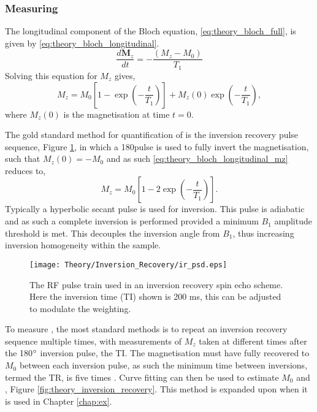 \subsubsection{Measuring \tone}
The longitudinal component of the Bloch equation, \eqref{eq:theory_bloch_full}, is given by \eqref{eq:theory_bloch_longitudinal}.
\begin{equation}
\frac{d\mathbf{M}_z}{dt} = - \frac{\left( M_z - M_0 \right)}{T_1}
\label{eq:theory_bloch_longitudinal}
\end{equation}
Solving this equation for $M_z$ gives,
\begin{equation}
M_z = M_0 \left[1 - \exp\left(-\frac{t}{T_1}\right) \right] + M_z\left( 0 \right) \exp \left(-\frac{t}{T_1}\right), 
\label{eq:theory_bloch_longitudinal_mz}
\end{equation}
where $M_z\left( 0 \right)$ is the magnetisation at time $t=0$.

The gold standard method for quantification of \tone is the inversion recovery pulse sequence, Figure \ref{fig:theory_inversion_recovery_psd}, in which a 180\degree{ }pulse is used to fully invert the magnetisation, such that $M_z(0) = -M_0$ and as such \eqref{eq:theory_bloch_longitudinal_mz} reduces to,
\begin{equation}
M_z = M_0 \left[1 - 2\exp\left(-\frac{t}{T_1}\right) \right].
\label{eq:theory_bloch_longitudinal_mz_inversion}
\end{equation}
Typically a hyperbolic secant pulse is used for inversion. This pulse is adiabatic and as such a complete inversion is performed provided a minimum $B_1$ amplitude threshold is met. This decouples the inversion angle from $B_1$, thus increasing inversion homogeneity within the sample.

\begin{figure}[H]
	\centering
	\texttt{[image: Theory/Inversion\_Recovery/ir\_psd.eps]}
	\caption{The \ac{RF} pulse train used in an inversion recovery spin echo scheme. Here the inversion time (\acs*{TI}) shown is 200 ms, this can be adjusted to modulate the \tone weighting.}
	\label{fig:theory_inversion_recovery_psd}	
\end{figure}

To measure \tone, the most standard methods is to repeat an inversion recovery sequence multiple times, with measurements of $M_z$ taken at different times after the 180$\degree$ inversion pulse, the \ac{TI}. The magnetisation must have fully recovered to $M_0$ between each inversion pulse, as such the minimum time between inversions, termed the \ac{TR}, is five times \tone. Curve fitting can then be used to estimate $M_0$ and \tone, Figure \ref{fig:theory_inversion_recovery}.
This method is expanded upon when it is used in Chapter \ref{chap:ex}.



